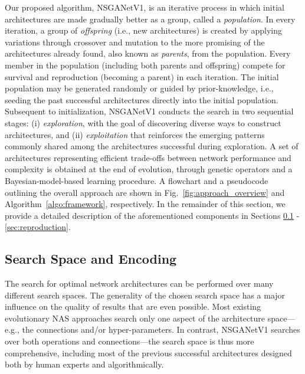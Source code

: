 \documentclass[journal]{IEEEtran}
\def\ourmethod{NSGANetV1}
\theoremstyle{definition}
\theoremstyle{remark}
\begin{document}
Our proposed algorithm, \ourmethod{}, is an iterative process in which initial architectures are made gradually better as a group, called a \emph{population}. In every iteration, a group of \emph{offspring} (i.e., new architectures) is created by applying variations through crossover and mutation to the more promising of the architectures already found, also known as \emph{parents}, from the population. Every  member in the population (including both parents and offspring) compete for survival and reproduction (becoming a parent) in each iteration. The initial population may be generated randomly or guided by prior-knowledge, i.e., seeding the past successful architectures directly into the initial population. Subsequent to initialization, \ourmethod{} conducts the search in two sequential stages: (i) \emph{exploration}, with the goal of discovering diverse ways to construct architectures, and (ii) \emph{exploitation} that reinforces the emerging patterns commonly shared among the architectures successful during exploration.
A set of architectures representing efficient trade-offs between network performance and complexity is obtained at the end of evolution, through genetic operators and a Bayesian-model-based learning procedure. A flowchart and a pseudocode outlining the overall approach are shown in Fig.~\ref{fig:approach_overview} and Algorithm~\ref{algo:framework}, respectively. In the remainder of this section, we provide a detailed description of the aforementioned components in Sections \ref{sec:search_space} - \ref{sec:reproduction}.

\begin{comment}
\ourmethod{} consists of three main components: (i) the \emph{search space} that defines all feasible architectures, (ii) the \emph{performance estimation} strategy that assesses the performance (via lower-level optimization) and complexity of each architecture candidate, and (iii) the multi-objective search strategy (blue boxes in Fig.~\ref{fig:approach_overview}) that iteratively selects and reproduces promising architectures.
\end{comment}

\subsection{Search Space and Encoding}\label{sec:search_space}
The search for optimal network architectures can be performed over many different search spaces. The generality of the chosen search space has a major influence on the quality of results that are even possible. Most existing evolutionary NAS approaches \cite{genetic-cnn,ae-cnn-e2epp,cgp-cnn,elsken2018efficient} search only one aspect of the architecture space---e.g., the connections and/or hyper-parameters. In contrast, \ourmethod{} searches over both operations and connections---the search space is thus more comprehensive, including most of the previous successful architectures designed both by human experts and algorithmically.
\end{document}
